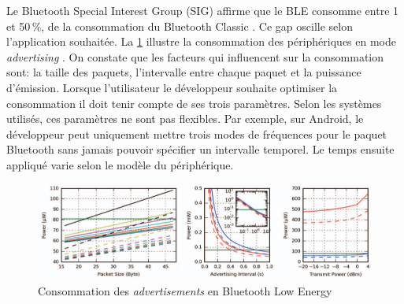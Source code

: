 Le Bluetooth Special Interest Group (SIG) affirme que le BLE consomme entre 1 et 50\,\%, de la consommation du Bluetooth Classic \cite{BLEConsumption:online}. Ce gap oscille selon l'application souhaitée. La \cref{fig-power_consumptions_ble_advertising} illustre la consommation des périphériques en mode \textit{advertising} \cite{BLECONSUMPTIONPUBLICATION}. On constate que les facteurs qui influencent sur la consommation sont: la taille des paquets, l'intervalle entre chaque paquet et la puissance d'émission. Lorsque l'utilisateur le développeur souhaite optimiser la consommation il doit tenir compte de ses trois paramètres. Selon les systèmes utilisés, ces paramètres ne sont pas flexibles. Par exemple, sur Android, le développeur peut uniquement mettre trois modes de fréquences pour le paquet Bluetooth sans jamais pouvoir spécifier un intervalle temporel. Le temps ensuite appliqué varie selon le modèle du périphérique.

\begin{figure}[ht!]
\centering
\includegraphics[width=1.0\textwidth]{Figures/Protocols/Bluetooth/power_consumptions.png}
\caption{Consommation des \textit{advertisements} en Bluetooth Low Energy}
\label{fig-power_consumptions_ble_advertising}
\end{figure}



\FloatBarrier



